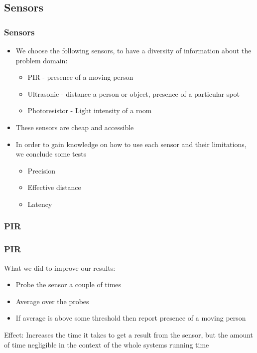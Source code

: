\lstset{language=HMMLanguage,numbers=left,breaklines=true,numbersep=0pt}
\subsection{Sensors}
\begin{frame}
	\frametitle{Sensors}
	\begin{itemize}
		\item We choose the following sensors, to have a diversity of information about the problem domain:
		\begin{itemize}
		  \item PIR - presence of a moving person
		  \item Ultrasonic - distance a person or object, presence of a particular spot
		  \item Photoresistor - Light intensity of a room
		\end{itemize}
		\item These sensors are cheap and accessible
		\item In order to gain knowledge on how to use each sensor and their limitations, we conclude some tests
		\begin{itemize}
		  \item Precision
		  \item Effective distance
		  \item Latency
		\end{itemize}
	\end{itemize}
\end{frame}
\subsubsection{PIR}
\begin{frame}
  \frametitle{PIR}
  What we did to improve our results:
	\begin{itemize}
	  \item Probe the sensor a couple of times
	  \item Average over the probes
	  \item If average is above some threshold then report presence of a moving person
	\end{itemize}
Effect: Increases the time it takes to get a result from the sensor, but the amount of time negligible in the context of the whole systems running time
\end{frame}
